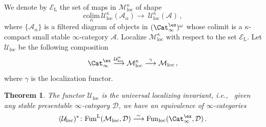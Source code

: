 \documentclass{amsart}
\newcommand{\cA}{{\mathcal A}}
\newcommand{\cD}{{\mathcal D}}
\newcommand{\cE}{{\mathcal E}}
\newcommand{\cM}{{\mathcal M}}
\newcommand{\cU}{{\mathcal U}}
\renewcommand{\L}{\mathrm{L}}
\newcommand{\stabcat}{\Cat_\i^{\ex}}
\newcommand{\Fun}{\mathrm{Fun}} %
\newcommand{\ie}{{i.e.,}\ }
\newcommand{\too}{\longrightarrow}%
\renewcommand{\i}{\infty}
\newcommand{\wMotloc}{\cM_{\mathrm{loc}}^\kappa}
\newcommand{\Motloc}{\cM_\mathrm{loc}}
\newcommand{\wUloc}{\cU_{\mathrm{loc}}^\kappa}
\newcommand{\Uloc}{\cU_{\mathrm{loc}}}
\numberwithin{equation}{section}
\newtheorem{theorem}[equation]{Theorem}
\theoremstyle{definition}
\begin{document}
We denote by $\cE_\L$ the set of maps in $\wMotloc$ of shape
\begin{equation*}
\underset{\alpha}{\mathrm{colim}}\, \wUloc(\cA_{\alpha}) \too \ \wUloc(\cA)\,,
\end{equation*}
where $\{\cA_{\alpha}\}$ is a filtered diagram of objects in $(\stabcat)^\omega$ whose
colimit is a $\kappa$-compact small stable $\i$-category $\cA$. Localize
$\wMotloc$ with respect to the set $\cE_\L$.  Let $\Uloc$ be the
following composition
\[
\stabcat \stackrel{\wUloc}{\too} \wMotloc \stackrel{\gamma}{\too} \Motloc\,,
\]
where $\gamma$ is the localization functor.

\begin{theorem}\label{thm:univ-loc}
The functor $\Uloc$ is the {\em universal localizing invariant}, \ie
given any stable presentable $\i$-category 
$\cD$, we have an equivalence of $\i$-categories 
$$(\Uloc)^{\ast}\colon \Fun^{\L}(\Motloc, \cD) \stackrel{\sim}{\too} \Fun_{\mathrm{loc}}(\stabcat, \cD)\,.$$
\end{theorem}
\end{document}
